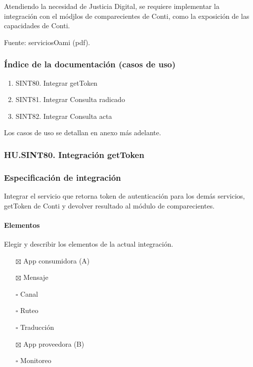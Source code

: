 \documentclass[
  paper=a4,
  ,captions=tableheading
]{scrartcl}
\providecommand{\tightlist}{%
  \setlength{\itemsep}{0pt}\setlength{\parskip}{0pt}}
\begin{document}
Atendiendo la necesidad de Justicia Digital, se requiere implementar la
integración con el módjlos de comparecientes de Conti, como la
exposición de las capacidades de Conti.

Fuente: serviciosOami (pdf).

\subsubsection{Índice de la documentación (casos de
uso)}\label{sec:uxedndice-de-la-documentaciuxf3n-casos-de-uso-1}

\begin{enumerate}
\def\labelenumi{\arabic{enumi}.}
\tightlist
\item
  SINT80. Integrar getToken
\item
  SINT81. Integrar Consulta radicado
\item
  SINT82. Integrar Consulta acta
\end{enumerate}

Los casos de uso se detallan en anexo más adelante.

\subsubsection{HU.SINT80. Integración
getToken}\label{sec:hu.sint80.-integraciuxf3n-gettoken}

\subsubsection{Especificación de
integración}\label{sec:especificaciuxf3n-de-integraciuxf3n}

Integrar el servicio que retorna token de autenticación para los demás
servicios, getToken de Conti y devolver resultado al módulo de
comparecientes.

\paragraph{Elementos}\label{sec:elementos}

Elegir y describir los elementos de la actual integración.

\begin{itemize}
\tightlist
\item[$\boxtimes$]
  App consumidora (A)
\item[$\boxtimes$]
  Mensaje
\item[$\square$]
  Canal
\item[$\square$]
  Ruteo
\item[$\square$]
  Traducción
\item[$\boxtimes$]
  App proveedora (B)
\item[$\square$]
  Monitoreo
\end{itemize}
\end{document}
